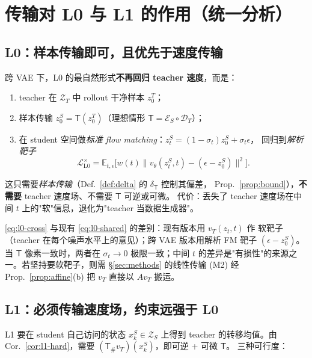 \documentclass[11pt,a4paper]{article}
\newcommand{\loss}{\mathcal{L}}
\newcommand{\E}{\mathbb{E}}
\newcommand{\Enc}{\mathcal{E}}
\newcommand{\Dec}{\mathcal{D}}
\newcommand{\Zt}{\mathcal{Z}_T}
\newcommand{\Zs}{\mathcal{Z}_S}
\newcommand{\Tmap}{\mathsf{T}}
\newcommand{\push}{\#}
\newcommand{\vT}{v_{T}}
\newcommand{\vS}{v_{\theta}}
\theoremstyle{definition}
\begin{document}
\section{传输对 L0 与 L1 的作用（统一分析）}
\label{sec:l0l1}

\subsection{L0：样本传输即可，且优先于速度传输}

\begin{tcolorbox}[colback=green!4,colframe=green!50!black,title=关键洞察 1：L0 用样本传输绕开 teacher 速度]
跨 VAE 下，L0 的最自然形式\textbf{不再回归 teacher 速度}，而是：
\begin{enumerate}[leftmargin=1.5em]
\item teacher 在 $\Zt$ 中 rollout 干净样本 $z_0^T$；
\item 样本传输 $z_0^S=\Tmap(z_0^T)$（理想情形 $\Tmap=\Enc_S\circ\Dec_T$）；
\item 在 student 空间做\emph{标准 flow matching}：$z_t^S=(1-\sigma_t)z_0^S+\sigma_t\epsilon$，
回归到\emph{解析靶子}
\begin{equation}
\loss_{\mathrm{L0}}^{\times}
=\E_{t,\epsilon}\Big[w(t)\big\lVert \vS(z_t^S,t)-(\epsilon-z_0^S)\big\rVert^2\Big].
\label{eq:l0-cross}
\end{equation}
\end{enumerate}
这只需要\emph{样本传输}（Def.~\ref{def:delta} 的 $\delta_{\Tmap}$ 控制其偏差，
Prop.~\ref{prop:bound}），\textbf{不需要} teacher 速度场、不需要 $\Tmap$ 可逆或可微。
代价：丢失了 teacher 速度场在中间 $t$ 上的"软"信息，退化为"teacher 当数据生成器"。
\end{tcolorbox}

\eqref{eq:l0-cross} 与现有 \eqref{eq:l0-shared} 的差别：现有版本用 $\vT(z_t,t)$ 作
软靶子（teacher 在每个噪声水平上的意见）；跨 VAE 版本用解析 FM 靶子
$(\epsilon-z_0^S)$。当 $\Tmap$ 像素一致时，两者在 $\sigma_t\to0$ 极限一致；中间 $t$
的差异是"有损性"的来源之一。若坚持要软靶子，则需 \S\ref{sec:methods} 的线性传输
(M2) 经 Prop.~\ref{prop:affine}(b) 把 $\vT$ 直接以 $A\vT$ 搬运。

\subsection{L1：必须传输速度场，约束远强于 L0}

L1 要在 student 自己访问的状态 $x_k^S\in\Zs$ 上得到 teacher 的转移均值。由
Cor.~\ref{cor:l1-hard}，需要 $(\Tmap_\push\vT)(x_k^S)$，即可逆 + 可微 $\Tmap$。
三种可行度：
\end{document}
